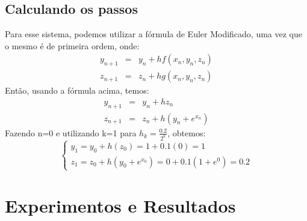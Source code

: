 \documentclass[10pt,a4paper]{article}
\begin{document}
\subsection{Calculando os passos}
Para esse sistema, podemos utilizar a fórmula de Euler Modificado, uma vez que o mesmo é de primeira ordem, onde:
\begin{equation}
\nonumber
\begin{array}{ccc}
y_{n+1}&=&y_n+hf(x_n,y_n,z_n)\\
z_{n+1}&=&z_n+hg(x_n,y_n,z_n)
\end{array}
\end{equation}
Então, usando a fórmula acima, temos:
\begin{equation}
\nonumber
\begin{array}{ccc}
y_{n+1}&=&y_n+hz_n\\
z_{n+1}&=&z_n+h(y_n+e^{x_n})
\end{array}
\end{equation}
Fazendo n=0 e utilizando k=1 para $h_k=\frac{0.2}{2^k}$, obtemos:
\begin{equation}
\nonumber
\begin{cases}
y_1=y_0+h(z_0)=1+0.1(0)=1\\
z_1=z_0+h(y_0+e^{x_0})=0+0.1(1+\textit{e}^0)=0.2
\end{cases}
\end{equation}
\newpage
\section{Experimentos e Resultados}
\end{document}
